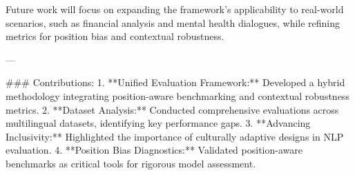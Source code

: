 Future work will focus on expanding the framework's applicability to real-world scenarios, such as financial analysis and mental health dialogues, while refining metrics for position bias and contextual robustness.

---

### Contributions:  
1. **Unified Evaluation Framework:** Developed a hybrid methodology integrating position-aware benchmarking and contextual robustness metrics.  
2. **Dataset Analysis:** Conducted comprehensive evaluations across multilingual datasets, identifying key performance gaps.  
3. **Advancing Inclusivity:** Highlighted the importance of culturally adaptive designs in NLP evaluation.  
4. **Position Bias Diagnostics:** Validated position-aware benchmarks as critical tools for rigorous model assessment.  

